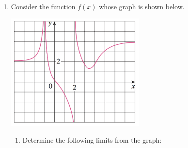 \documentclass[11pt,fleqn]{article}
\begin{document}
\setlength{\parindent}{0cm}
\renewcommand{\headrulewidth}{0pt}
\newcommand{\blank}[1]{\rule{#1}{0.75pt}}
\renewcommand{\d}{\displaystyle}
\vspace*{-0.7in}
\begin{center}
  \LARGE {}
\end{center}

\begin{enumerate}

%
%
%

\item Consider the function $f(x)$ whose graph is shown below. %
%
%


%
\begin{adjustbox}{valign=t,minipage={.4\textwidth}}
\begin{center}

    \includegraphics[width=2.75in]{limits-at-infinity}

 \end{center}
\end{adjustbox}
%
%
\begin{adjustbox}{valign=t,minipage={.45\textwidth}}
\begin{center}
\begin{enumerate}
   \item Determine the following limits from the graph:
    

\end{enumerate}
\end{center}
\end{adjustbox}
\end{enumerate}
\end{document}
